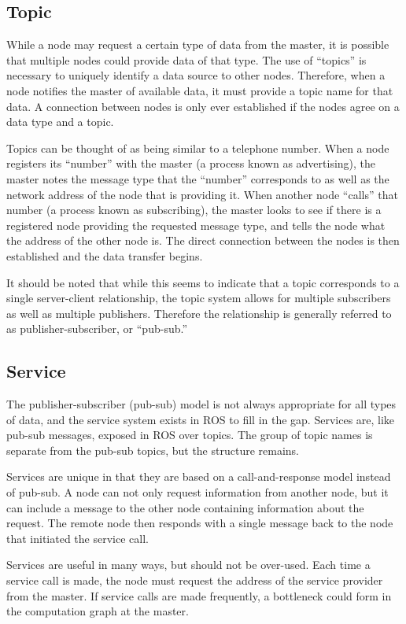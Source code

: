 \hypertarget{topic}{%
\subsection{Topic}\label{topic}}

While a node may request a certain type of data from the master, it is
possible that multiple nodes could provide data of that type. The use of
``topics'' is necessary to uniquely identify a data source to other
nodes. Therefore, when a node notifies the master of available data, it
must provide a topic name for that data. A connection between nodes is
only ever established if the nodes agree on a data type and a topic.

Topics can be thought of as being similar to a telephone number. When a
node registers its ``number'' with the master (a process known as
advertising), the master notes the message type that the ``number''
corresponds to as well as the network address of the node that is
providing it. When another node ``calls'' that number (a process known
as subscribing), the master looks to see if there is a registered node
providing the requested message type, and tells the node what the
address of the other node is. The direct connection between the nodes is
then established and the data transfer begins.

It should be noted that while this seems to indicate that a topic
corresponds to a single server-client relationship, the topic system
allows for multiple subscribers as well as multiple publishers.
Therefore the relationship is generally referred to as
publisher-subscriber, or ``pub-sub.''

\hypertarget{service}{%
\subsection{Service}\label{service}}

The publisher-subscriber (pub-sub) model is not always appropriate for
all types of data, and the service system exists in ROS to fill in the
gap. Services are, like pub-sub messages, exposed in ROS over topics.
The group of topic names is separate from the pub-sub topics, but the
structure remains.

Services are unique in that they are based on a call-and-response model
instead of pub-sub. A node can not only request information from another
node, but it can include a message to the other node containing
information about the request. The remote node then responds with a
single message back to the node that initiated the service call.

Services are useful in many ways, but should not be over-used. Each time
a service call is made, the node must request the address of the service
provider from the master. If service calls are made frequently, a
bottleneck could form in the computation graph at the master.
